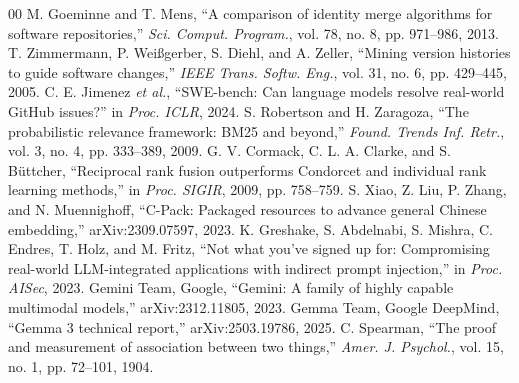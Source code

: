 \documentclass[conference]{IEEEtran}
\newcommand{\fixme}[1]{\textcolor{red}{#1}}
\newcommand{\res}[1]{#1}
\begin{document}
\begin{thebibliography}{00}
 M. Goeminne and T. Mens, ``A comparison of identity merge algorithms for software repositories,'' \textit{Sci. Comput. Program.}, vol. 78, no. 8, pp. 971--986, 2013.
 T. Zimmermann, P. Wei{\ss}gerber, S. Diehl, and A. Zeller, ``Mining version histories to guide software changes,'' \textit{IEEE Trans. Softw. Eng.}, vol. 31, no. 6, pp. 429--445, 2005.
 C. E. Jimenez \textit{et al.}, ``SWE-bench: Can language models resolve real-world GitHub issues?'' in \textit{Proc. ICLR}, 2024.
 S. Robertson and H. Zaragoza, ``The probabilistic relevance framework: BM25 and beyond,'' \textit{Found. Trends Inf. Retr.}, vol. 3, no. 4, pp. 333--389, 2009.
 G. V. Cormack, C. L. A. Clarke, and S. B\"uttcher, ``Reciprocal rank fusion outperforms Condorcet and individual rank learning methods,'' in \textit{Proc. SIGIR}, 2009, pp. 758--759.
 S. Xiao, Z. Liu, P. Zhang, and N. Muennighoff, ``C-Pack: Packaged resources to advance general Chinese embedding,'' arXiv:2309.07597, 2023.
 K. Greshake, S. Abdelnabi, S. Mishra, C. Endres, T. Holz, and M. Fritz, ``Not what you've signed up for: Compromising real-world LLM-integrated applications with indirect prompt injection,'' in \textit{Proc. AISec}, 2023.
 Gemini Team, Google, ``Gemini: A family of highly capable multimodal models,'' arXiv:2312.11805, 2023.
 Gemma Team, Google DeepMind, ``Gemma 3 technical report,'' arXiv:2503.19786, 2025.
 C. Spearman, ``The proof and measurement of association between two things,'' \textit{Amer. J. Psychol.}, vol. 15, no. 1, pp. 72--101, 1904.
\end{thebibliography}

\end{document}
